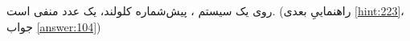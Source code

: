 \section{}
\paragraph{}\label{hint:104}
روی یک سیستم ،  پیش‌شماره کلولند، یک عدد منفی است. (راهنماییِ بعدی \ref{hint:223}، جواب \ref{answer:104})